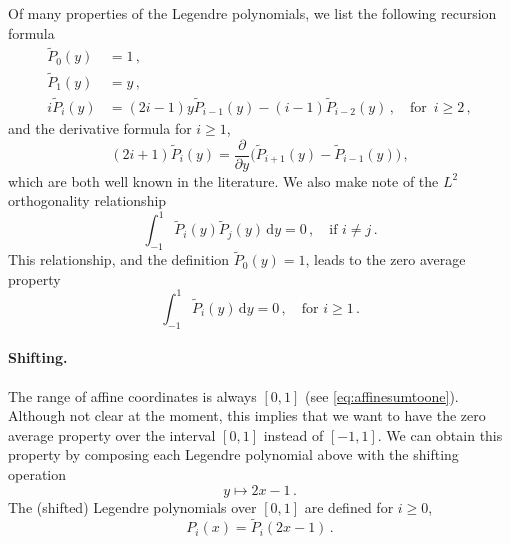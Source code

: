 Of many properties of the Legendre polynomials, we list the following recursion formula
\begin{equation}
\begin{aligned}
	\tilde{P}_0(y)&=1\,,\\
	\tilde{P}_1(y)&=y\,,\\
	i\tilde{P}_i(y)&=(2i-1)y\tilde{P}_{i-1}(y) - (i-1)\tilde{P}_{i-2}(y)\,, \quad \text{for }\, i\geq2\,,
\end{aligned}
\label{eq:recursion1}
\end{equation}
and the derivative formula for $i\geq1$,
\begin{equation}
(2i+1) \tilde{P}_i(y) = \frac{\partial}{\partial y} \Big(\tilde{P}_{i+1}(y)-\tilde{P}_{i-1}(y)\Big)\,,
\label{eq:Dervivative1}
\end{equation}
which are both well known in the literature. We also make note of the $L^2$ orthogonality relationship
\begin{equation}
\int_{-1}^{1} \tilde{P}_i(y)\tilde{P}_j(y)\,\mathrm{d}y=0\,, \quad \text{if } i\neq j\,.
\label{eq:Orthogonality1}
\end{equation}
This relationship, and the definition $\tilde{P}_0(y) = 1$, leads to the zero average property
\begin{equation}
\int_{-1}^{1} \tilde{P}_i(y)\,\mathrm{d}y=0\,, \quad \text{for } i\geq1\,.
\label{eq:ZeroAverage1}
\end{equation}

\paragraph{Shifting.}
The range of affine coordinates is always $[0,1]$ (see \eqref{eq:affinesumtoone}).
Although not clear at the moment, this implies that we want to have the zero average property over the interval $[0,1]$ instead of $[-1,1]$.
We can obtain this property by composing each Legendre polynomial above with the shifting operation
\begin{equation}
y \mapsto 2x-1\,.
\label{eq:shift}
\end{equation}
The (shifted) Legendre polynomials over $[0,1]$ are defined for $i\geq0$,
\begin{equation}
P_i(x) = \tilde{P}_i\left(2x-1\right)\,.
\end{equation}

